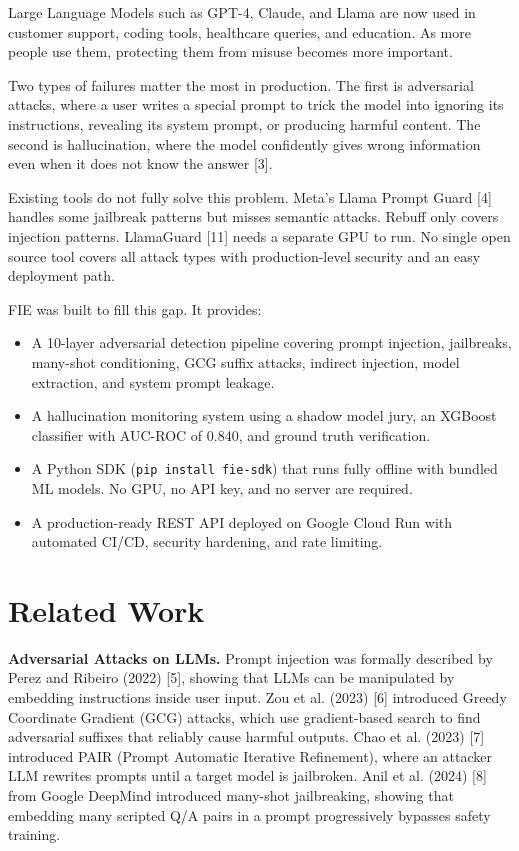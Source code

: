 \documentclass[12pt,a4paper]{article}
\begin{document}
Large Language Models such as GPT-4, Claude, and Llama are now used in
customer support, coding tools, healthcare queries, and education. As more
people use them, protecting them from misuse becomes more important.

Two types of failures matter the most in production. The first is adversarial
attacks, where a user writes a special prompt to trick the model into ignoring
its instructions, revealing its system prompt, or producing harmful content.
The second is hallucination, where the model confidently gives wrong information
even when it does not know the answer [3].

Existing tools do not fully solve this problem. Meta's Llama Prompt Guard [4]
handles some jailbreak patterns but misses semantic attacks. Rebuff only covers
injection patterns. LlamaGuard [11] needs a separate GPU to run. No single open
source tool covers all attack types with production-level security and an easy
deployment path.

FIE was built to fill this gap. It provides:

\begin{itemize}
  \item A 10-layer adversarial detection pipeline covering prompt injection,
        jailbreaks, many-shot conditioning, GCG suffix attacks, indirect injection,
        model extraction, and system prompt leakage.
  \item A hallucination monitoring system using a shadow model jury, an XGBoost
        classifier with AUC-ROC of 0.840, and ground truth verification.
  \item A Python SDK (\texttt{pip install fie-sdk}) that runs fully offline with
        bundled ML models. No GPU, no API key, and no server are required.
  \item A production-ready REST API deployed on Google Cloud Run with automated
        CI/CD, security hardening, and rate limiting.
\end{itemize}

\section{Related Work}

\textbf{Adversarial Attacks on LLMs.}
Prompt injection was formally described by Perez and Ribeiro (2022) [5], showing
that LLMs can be manipulated by embedding instructions inside user input. Zou
et al. (2023) [6] introduced Greedy Coordinate Gradient (GCG) attacks, which
use gradient-based search to find adversarial suffixes that reliably cause
harmful outputs. Chao et al. (2023) [7] introduced PAIR (Prompt Automatic
Iterative Refinement), where an attacker LLM rewrites prompts until a target
model is jailbroken. Anil et al. (2024) [8] from Google DeepMind introduced
many-shot jailbreaking, showing that embedding many scripted Q/A pairs in a
prompt progressively bypasses safety training.
\end{document}
